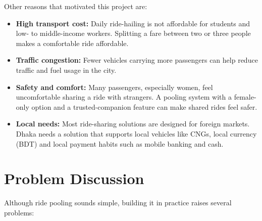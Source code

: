 Other reasons that motivated this project are:

\begin{itemize}
  \item \textbf{High transport cost:} Daily ride-hailing is not affordable for
        students and low- to middle-income workers. Splitting a fare between
        two or three people makes a comfortable ride affordable.
  \item \textbf{Traffic congestion:} Fewer vehicles carrying more passengers
        can help reduce traffic and fuel usage in the city.
  \item \textbf{Safety and comfort:} Many passengers, especially women, feel
        uncomfortable sharing a ride with strangers. A pooling system with a
        female-only option and a trusted-companion feature can make shared
        rides feel safer.
  \item \textbf{Local needs:} Most ride-sharing solutions are designed for
        foreign markets. Dhaka needs a solution that supports local vehicles
        like CNGs, local currency (BDT) and local payment habits such as mobile
        banking and cash.
\end{itemize}

\section{Problem Discussion}
\label{sec:problem}

Although ride pooling sounds simple, building it in practice raises several
problems:

